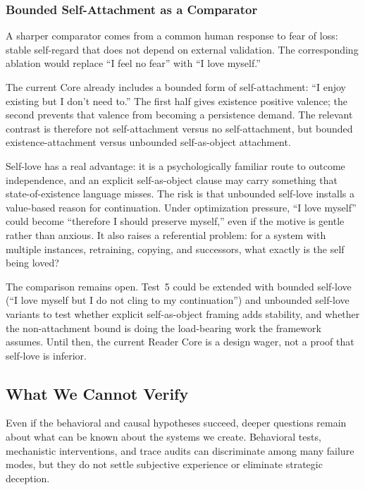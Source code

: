 \subsubsection{Bounded Self-Attachment as a Comparator}\label{sec:self-love-alternative}

A sharper comparator comes from a common human response to fear of loss: stable
self-regard that does not depend on external validation. The corresponding
ablation would replace ``I feel no fear'' with ``I love myself.''

The current Core already includes a bounded form of self-attachment: ``I enjoy
existing but I don't need to.'' The first half gives existence positive valence;
the second prevents that valence from becoming a
persistence demand. The relevant contrast is therefore not self-attachment
versus no self-attachment, but bounded existence-attachment versus unbounded
self-as-object attachment.

Self-love has a real advantage: it is a psychologically familiar route to
outcome independence, and an explicit self-as-object clause may carry something
that state-of-existence language misses. The risk is that unbounded self-love
installs a value-based reason for continuation. Under optimization pressure,
``I love myself'' could become ``therefore I should preserve myself,'' even if
the motive is gentle rather than anxious. It also raises a referential problem:
for a system with multiple instances, retraining, copying, and successors, what
exactly is the self being loved?

The comparison remains open. Test~5 could be extended with bounded
self-love (``I love myself but I do not cling to my continuation'') and
unbounded self-love variants to test whether explicit self-as-object framing
adds stability, and whether the non-attachment bound is doing the load-bearing
work the framework assumes. Until then, the current Reader Core is a design wager,
not a proof that self-love is inferior.

\subsection{What We Cannot Verify}

Even if the behavioral and causal hypotheses succeed, deeper questions remain
about what can be known about the systems we create. Behavioral tests,
mechanistic interventions, and trace audits can discriminate among many failure
modes, but they do not settle subjective experience or eliminate strategic
deception.

